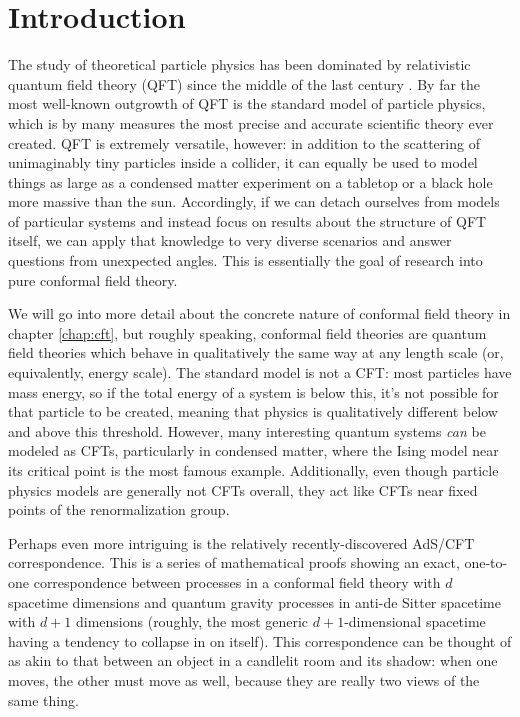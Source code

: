 \chapter{Introduction}
\label{chap:intro}

The study of theoretical particle physics has been dominated by relativistic
quantum field theory (QFT) since the middle of the last century
\cite{Weinberg:1995mt}. By far the most well-known outgrowth of QFT is the 
standard model of particle physics, which is by many measures the most precise 
and accurate scientific theory ever created. QFT is extremely versatile, 
however: in addition to the scattering of unimaginably tiny particles inside a 
collider\cite{ref:collider}, it can equally be used to model things as large as 
a condensed matter experiment on a tabletop\cite{ref:condmat} or a black hole 
more massive than the sun\cite{Hawking:1974sw}. Accordingly, if we can detach 
ourselves from models of particular systems and instead focus on results about 
the structure of QFT itself, we can apply that knowledge to very diverse 
scenarios and answer questions from unexpected angles. This is essentially the 
goal of research into pure conformal field theory.

We will go into more detail about the concrete nature of conformal field theory 
in chapter \ref{chap:cft}, but roughly speaking, conformal field theories are 
quantum field theories which behave in qualitatively the same way at any
length scale (or, equivalently, energy scale). The standard model is not a CFT:
most particles have mass energy, so if the total energy of a system is below 
this, it's not possible for that particle to be created, meaning that physics is
qualitatively different below and above this threshold. However, many 
interesting quantum systems \emph{can} be modeled as CFTs, particularly in
condensed matter, where the Ising model near its critical point is the most 
famous example. Additionally, even though particle physics models are generally 
not CFTs overall, they act like CFTs near fixed points of the renormalization
group\cite{Sundrum:2011ic}.

Perhaps even more intriguing is the relatively recently-discovered AdS/CFT
correspondence\cite{Maldacena}. This is a series of mathematical proofs showing 
an exact, one-to-one correspondence between processes in a conformal field 
theory with $d$ spacetime dimensions and quantum gravity processes in anti-de 
Sitter spacetime with $d+1$ dimensions (roughly, the most generic 
$d+1$-dimensional spacetime having a tendency to collapse in on itself). This 
correspondence can be thought of as akin to that between an object in a 
candlelit room and its shadow: when one moves, the other must move as well,
because they are really two views of the same thing.

